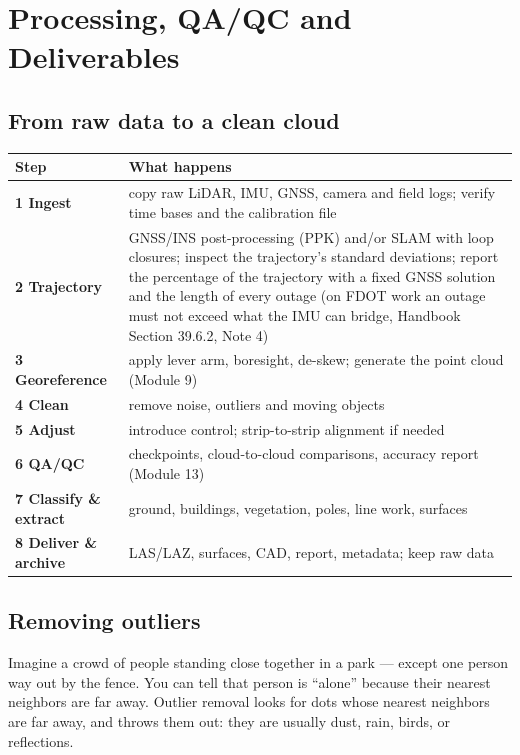 \chapter{Processing, QA/QC and Deliverables}

\section{From raw data to a clean cloud}

\begin{center}\small
\renewcommand{\arraystretch}{1.2}
\begin{tabularx}{\linewidth}{>{\bfseries}lX}\toprule
Step & What happens \\\midrule
1 Ingest & copy raw LiDAR, IMU, GNSS, camera and field logs; verify time bases and the calibration file\\
2 Trajectory & GNSS/INS post-processing (PPK) and/or SLAM with loop closures; inspect the trajectory's standard deviations; report the percentage of the trajectory with a fixed GNSS solution and the length of every outage (on FDOT work an outage must not exceed what the IMU can bridge, Handbook Section 39.6.2, Note 4)\\
3 Georeference & apply lever arm, boresight, de-skew; generate the point cloud (Module 9)\\
4 Clean & remove noise, outliers and moving objects\\
5 Adjust & introduce control; strip-to-strip alignment if needed\\
6 QA/QC & checkpoints, cloud-to-cloud comparisons, accuracy report (Module 13)\\
7 Classify \& extract & ground, buildings, vegetation, poles, line work, surfaces\\
8 Deliver \& archive & LAS/LAZ, surfaces, CAD, report, metadata; keep raw data\\\bottomrule
\end{tabularx}\end{center}

\section{Removing outliers}
\begin{kid}
Imagine a crowd of people standing close together in a park --- except one person way out by the fence. You can tell that person is ``alone'' because their nearest neighbors are far away. Outlier removal looks for dots whose nearest neighbors are far away, and throws them out: they are usually dust, rain, birds, or reflections.
\end{kid}

